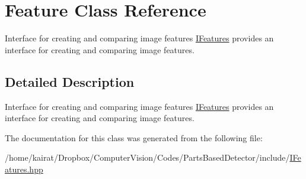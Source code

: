 \hypertarget{classFeature}{}\section{Feature Class Reference}
\label{classFeature}


Interface for creating and comparing image features \hyperlink{classIFeatures}{I\+Features} provides an interface for creating and comparing image features.  




\subsection{Detailed Description}
Interface for creating and comparing image features \hyperlink{classIFeatures}{I\+Features} provides an interface for creating and comparing image features. 

The documentation for this class was generated from the following file\+:\begin{DoxyCompactItemize}
\item 
/home/kairat/\+Dropbox/\+Computer\+Vision/\+Codes/\+Parts\+Based\+Detector/include/\hyperlink{IFeatures_8hpp}{I\+Features.\+hpp}\end{DoxyCompactItemize}
